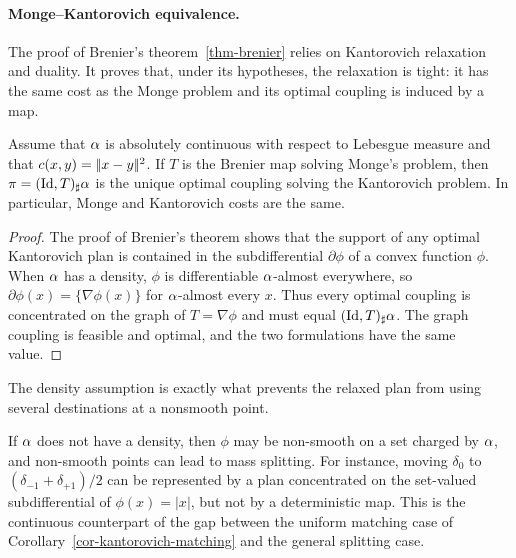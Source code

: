 \paragraph{Monge--Kantorovich equivalence.}

The proof of Brenier's theorem~\ref{thm-brenier} relies on Kantorovich relaxation and duality. It proves that, under its hypotheses, the relaxation is tight: it has the same cost as the Monge problem and its optimal coupling is induced by a map.

\begin{cor}\label{cor-monge-kantorovich-brenier}
	Assume that $\alpha$ is absolutely continuous with respect to Lebesgue measure and that $c(x,y)=|\!| x-y |\!|^2$. If $T$ is the Brenier map solving Monge's problem, then $\pi=(\mathrm{Id},T)_\sharp\alpha$ is the unique optimal coupling solving the Kantorovich problem. In particular, Monge and Kantorovich costs are the same.
\end{cor}
\begin{proof}
	The proof of Brenier's theorem shows that the support of any optimal Kantorovich plan is contained in the subdifferential $\partial\phi$ of a convex function $\phi$. When $\alpha$ has a density, $\phi$ is differentiable $\alpha$-almost everywhere, so $\partial\phi(x)=\{\nabla\phi(x)\}$ for $\alpha$-almost every $x$. Thus every optimal coupling is concentrated on the graph of $T=\nabla\phi$ and must equal $(\mathrm{Id},T)_\sharp\alpha$. The graph coupling is feasible and optimal, and the two formulations have the same value.
\end{proof}

The density assumption is exactly what prevents the relaxed plan from using several destinations at a nonsmooth point.

\begin{rem}
	If $\alpha$ does not have a density, then $\phi$ may be non-smooth on a set charged by $\alpha$, and non-smooth points can lead to mass splitting. For instance, moving $\delta_0$ to $(\delta_{-1}+\delta_{+1})/2$ can be represented by a plan concentrated on the set-valued subdifferential of $\phi(x)=|x|$, but not by a deterministic map. This is the continuous counterpart of the gap between the uniform matching case of Corollary~\ref{cor-kantorovich-matching} and the general splitting case.
\end{rem}


